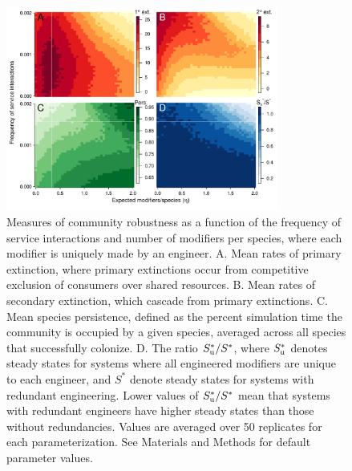 \documentclass[9pt,twocolumn,twoside]{pnas-new}
\begin{document}
\begin{figure}[h!]
\centering
\includegraphics[width=0.8\textwidth]{fig_engineers4_unique.pdf}
\caption{
Measures of community robustness as a function of the frequency of service interactions and number of modifiers per species, where each modifier is uniquely made by an engineer.
A. Mean rates of primary extinction, where primary extinctions occur from competitive exclusion of consumers over shared resources.
B. Mean rates of secondary extinction, which cascade from primary extinctions.
C. Mean species persistence, defined as the percent simulation time the community is occupied by a given species, averaged across all species that successfully colonize.
D. The ratio $S^*_{\rm u}/S^*$, where $S^*_{\rm u}$ denotes steady states for systems where all engineered modifiers are unique to each engineer, and $S^*$ denote steady states for systems with redundant engineering. Lower values of $S^*_{\rm u}/S^*$ mean that systems with redundant engineers have higher steady states than those without redundancies.
Values are averaged over 50 replicates for each parameterization.
See Materials and Methods for default parameter values.
}
\label{fig:unique}
\end{figure}
\end{document}
